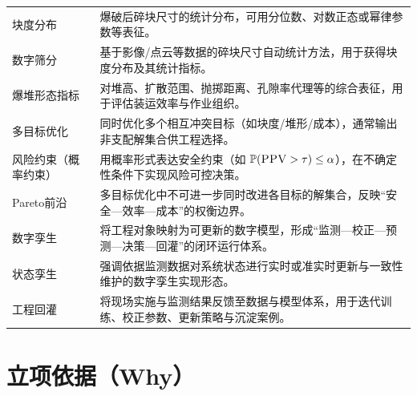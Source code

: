 \documentclass[12pt,a4paper,fontset=mac]{ctexart}
\newcommand{\PPV}{\textsc{PPV}}
\begin{document}
\begin{longtable}{
  >{\raggedright\arraybackslash}p{3.4cm}
  >{\raggedright\arraybackslash}p{\dimexpr\linewidth-3.4cm-2\tabcolsep\relax}
}
块度分布 & 爆破后碎块尺寸的统计分布，可用分位数、对数正态或幂律参数等表征。\\
数字筛分 & 基于影像/点云等数据的碎块尺寸自动统计方法，用于获得块度分布及其统计指标。\\
爆堆形态指标 & 对堆高、扩散范围、抛掷距离、孔隙率代理等的综合表征，用于评估装运效率与作业组织。\\
多目标优化 & 同时优化多个相互冲突目标（如块度/堆形/成本），通常输出非支配解集合供工程选择。\\
风险约束（概率约束） & 用概率形式表达安全约束（如 $\mathbb{P}(\PPV>\tau)\le \alpha$），在不确定性条件下实现风险可控决策。\\
Pareto前沿 & 多目标优化中不可进一步同时改进各目标的解集合，反映“安全—效率—成本”的权衡边界。\\
数字孪生 & 将工程对象映射为可更新的数字模型，形成“监测—校正—预测—决策—回灌”的闭环运行体系。\\
状态孪生 & 强调依据监测数据对系统状态进行实时或准实时更新与一致性维护的数字孪生实现形态。\\
工程回灌 & 将现场实施与监测结果反馈至数据与模型体系，用于迭代训练、校正参数、更新策略与沉淀案例。\\

\end{longtable}

\normalsize
\newpage

\section{立项依据（Why）}
\end{document}
